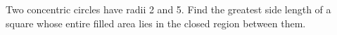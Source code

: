 Two concentric circles have radii 2 and 5. Find the greatest side length of a square whose entire filled area lies in the closed region between them.
